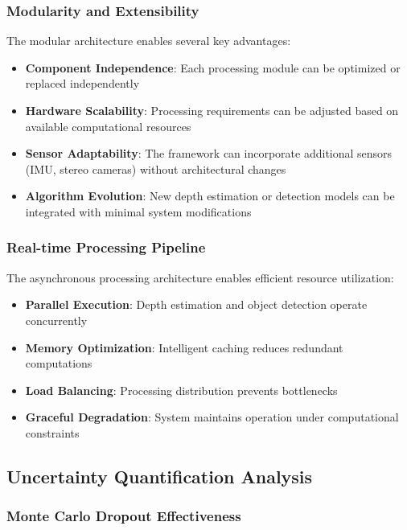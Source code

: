 \documentclass[10pt]{article}
\begin{document}
\subsubsection{Modularity and Extensibility}

The modular architecture enables several key advantages:

\begin{itemize}
\item \textbf{Component Independence}: Each processing module can be optimized or replaced independently
\item \textbf{Hardware Scalability}: Processing requirements can be adjusted based on available computational resources
\item \textbf{Sensor Adaptability}: The framework can incorporate additional sensors (IMU, stereo cameras) without architectural changes
\item \textbf{Algorithm Evolution}: New depth estimation or detection models can be integrated with minimal system modifications
\end{itemize}

\subsubsection{Real-time Processing Pipeline}

The asynchronous processing architecture enables efficient resource utilization:

\begin{itemize}
\item \textbf{Parallel Execution}: Depth estimation and object detection operate concurrently
\item \textbf{Memory Optimization}: Intelligent caching reduces redundant computations
\item \textbf{Load Balancing}: Processing distribution prevents bottlenecks
\item \textbf{Graceful Degradation}: System maintains operation under computational constraints
\end{itemize}

\subsection{Uncertainty Quantification Analysis}

\subsubsection{Monte Carlo Dropout Effectiveness}
\end{document}
